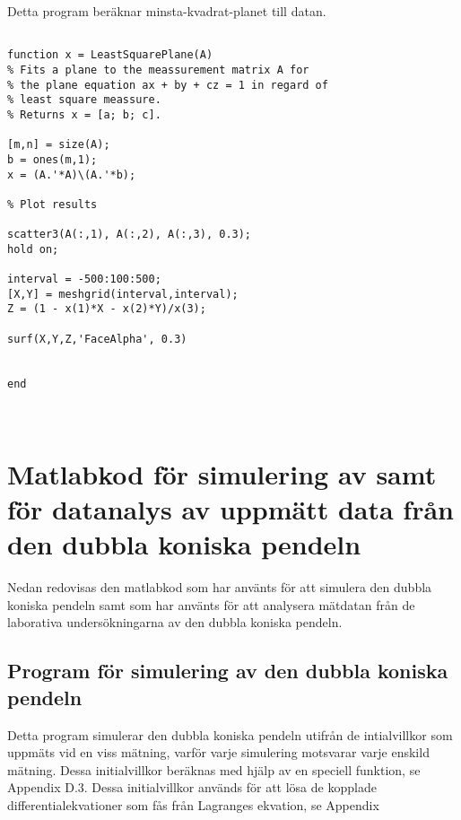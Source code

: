 Detta program beräknar minsta-kvadrat-planet till datan.  

\begin{lstlisting}[style=Matlab-editor]

function x = LeastSquarePlane(A)
% Fits a plane to the meassurement matrix A for
% the plane equation ax + by + cz = 1 in regard of
% least square meassure.
% Returns x = [a; b; c].

[m,n] = size(A);
b = ones(m,1);
x = (A.'*A)\(A.'*b);

% Plot results

scatter3(A(:,1), A(:,2), A(:,3), 0.3);
hold on;

interval = -500:100:500;
[X,Y] = meshgrid(interval,interval);
Z = (1 - x(1)*X - x(2)*Y)/x(3);

surf(X,Y,Z,'FaceAlpha', 0.3)


end



\end{lstlisting}







\section{Matlabkod för simulering av samt för datanalys av uppmätt data från den dubbla koniska pendeln}

Nedan redovisas den matlabkod som har använts för att simulera den dubbla koniska pendeln samt som har använts för att analysera mätdatan från de laborativa undersökningarna av den dubbla koniska pendeln. 

\subsection{Program för simulering av den dubbla koniska pendeln}

Detta program simulerar den dubbla koniska pendeln utifrån de intialvillkor som uppmäts vid en viss mätning, varför varje simulering motsvarar varje enskild mätning. Dessa initialvillkor beräknas med hjälp av en speciell funktion, se Appendix D.3. Dessa initialvillkor används för att lösa de kopplade differentialekvationer som fås från Lagranges ekvation, se Appendix 

